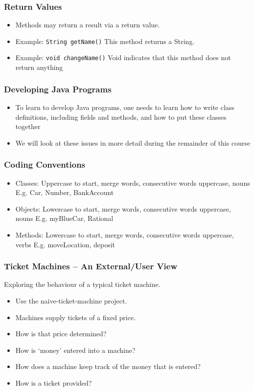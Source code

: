\documentclass{beamer}
\begin{document}
\begin{frame}
\frametitle{Return Values}
\begin{itemize}
\item Methods may return a result via a \alert{return value}.
\item Example: \lstinline!String getName()‏!
This method returns a String.
\item Example: \lstinline!void changeName()‏!
\alert{Void} indicates that this method does not return anything
\end{itemize}
\end{frame}

\begin{frame}
\frametitle{Developing Java Programs}
\begin{itemize}
\item To learn to develop Java programs, one needs to learn how to write class definitions, including fields and methods, and how to put these classes together
\item We will look at these issues in more detail during the remainder of this course
\end{itemize}
\end{frame}

\begin{frame}
\frametitle{Coding Conventions}
\begin{itemize}
\item Classes: Uppercase to start, merge words, consecutive words uppercase, nouns
E.g. Car, Number, BankAccount
\item Objects: Lowercase to start, merge words, consecutive words uppercase, nouns
E.g. myBlueCar, Rational
\item Methods: Lowercase to start, merge words, consecutive words uppercase, verbs
E.g. moveLocation, deposit
\end{itemize}
\end{frame}

\begin{frame}
\frametitle{Ticket Machines – An External/User View}
Exploring the behaviour of a typical ticket machine.
\begin{itemize}
\item Use the naive-ticket-machine project.
\item Machines supply tickets of a fixed price.
\item How is that price determined?
\item How is ‘money’ entered into a machine?
\item How does a machine keep track of the money that is entered?
\item How is a ticket provided?
\end{itemize}
\end{frame}
\end{document}
